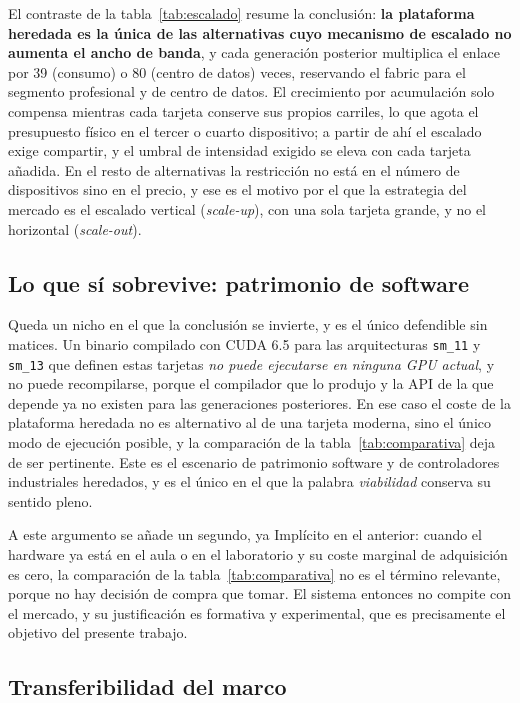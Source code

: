 \documentclass[a4paper,11pt]{article}
\begin{document}
El contraste de la tabla~\ref{tab:escalado} resume la conclusión: \textbf{la plataforma heredada es la única de las alternativas
cuyo mecanismo de escalado no aumenta el ancho de banda}, y cada generación posterior multiplica el enlace por 39 (consumo) o 80
(centro de datos) veces, reservando el fabric para el segmento profesional y de centro de datos. El crecimiento por acumulación
solo compensa mientras cada tarjeta conserve sus propios carriles, lo que agota el presupuesto físico en el tercer o cuarto
dispositivo; a partir de ahí el escalado exige compartir, y el umbral de intensidad exigido se eleva con cada tarjeta añadida. En
el resto de alternativas la restricción no está en el número de dispositivos sino en el precio, y ese es el motivo por el que la
estrategia del mercado es el escalado vertical (\emph{scale-up}), con una sola tarjeta grande, y no el horizontal
(\emph{scale-out}).

\subsection*{Lo que sí sobrevive: patrimonio de software}

Queda un nicho en el que la conclusión se invierte, y es el único defendible sin matices. Un binario compilado con CUDA 6.5 para
las arquitecturas \texttt{sm\_11} y \texttt{sm\_13} que definen estas tarjetas \emph{no puede ejecutarse en ninguna GPU
actual}, y no puede recompilarse, porque el compilador que lo produjo y la API de la que depende ya no existen para las
generaciones posteriores. En ese caso el coste de la plataforma heredada no es alternativo al de una tarjeta moderna, sino el
único modo de ejecución posible, y la comparación de la tabla~\ref{tab:comparativa} deja de ser pertinente. Este es el escenario
de patrimonio software y de controladores industriales heredados, y es el único en el que la palabra \emph{viabilidad} conserva
su sentido pleno.

A este argumento se añade un segundo, ya Implícito en el anterior: cuando el hardware ya está en el aula o en el laboratorio y su
coste marginal de adquisición es cero, la comparación de la tabla~\ref{tab:comparativa} no es el término relevante, porque no hay
decisión de compra que tomar. El sistema entonces no compite con el mercado, y su justificación es formativa y experimental, que es
precisamente el objetivo del presente trabajo.

\subsection*{Transferibilidad del marco}
\end{document}

